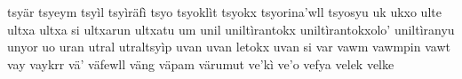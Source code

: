 tsyär\hspace{2mm}
tsyeym\hspace{2mm}
tsyìl\hspace{2mm}
tsyìräfì\hspace{2mm}
tsyo\hspace{2mm}
tsyoklìt\hspace{2mm}
tsyokx\hspace{2mm}
tsyorina'wll\hspace{2mm}
tsyosyu\hspace{2mm}
uk\hspace{2mm}
ukxo\hspace{2mm}
ulte\hspace{2mm}
ultxa\hspace{2mm}
ultxa si\hspace{2mm}
ultxarun\hspace{2mm}
ultxatu\hspace{2mm}
um\hspace{2mm}
unil\hspace{2mm}
uniltìrantokx\hspace{2mm}
uniltìrantokxolo'\hspace{2mm}
uniltìranyu\hspace{2mm}
unyor\hspace{2mm}
uo\hspace{2mm}
uran\hspace{2mm}
utral\hspace{2mm}
utraltsyìp\hspace{2mm}
uvan\hspace{2mm}
uvan letokx\hspace{2mm}
uvan si\hspace{2mm}
var\hspace{2mm}
vawm\hspace{2mm}
vawmpin\hspace{2mm}
vawt\hspace{2mm}
vay\hspace{2mm}
vaykrr\hspace{2mm}
vä'\hspace{2mm}
väfewll\hspace{2mm}
väng\hspace{2mm}
väpam\hspace{2mm}
värumut\hspace{2mm}
ve'kì\hspace{2mm}
ve'o\hspace{2mm}
vefya\hspace{2mm}
velek\hspace{2mm}
velke\hspace{2mm}
